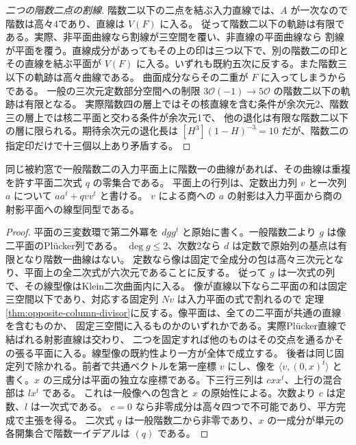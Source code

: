 \begin{proof}[二つの階数二点の割線]
階数二以下の二点を結ぶ入力直線では、$A$ が一次なので階数は高々4であり、直線は $V(F)$ に入る。
従って階数二以下の軌跡は有限である。実際、非平面曲線なら割線が三空間を覆い、非直線の平面曲線なら
割線が平面を覆う。直線成分があってもその上の印は三つ以下で、別の階数二の印とその直線を結ぶ平面が
$V(F)$ に入る。いずれも既約五次に反する。また階数三以下の軌跡は高々曲線である。
曲面成分ならその二重が $F$ に入ってしまうからである。
一般の三次元定数部分空間への制限 $3\mathcal O(-1)\to5\mathcal O$ の階数二以下の軌跡は有限となる。
実際階数四の層上ではその核直線を含む条件が余次元2、階数三の層上では核二平面と交わる条件が余次元1で、
他の退化は有限な階数二以下の層に限られる。期待余次元の退化長は
$[H^3](1-H)^{-3}=10$ だが、階数二の指定印だけで十三個以上あり矛盾する。
\end{proof}

\begin{proposition}\label{prop:rank-two-plane-conic-trace}
同じ被約窓で一般階数二の入力平面上に階数一の曲線があれば、その曲線は重複を許す平面二次式 $q$ の零集合である。
平面上の行列は、定数出力列 $v$ と一次列 $a$ について $aa^t+q vv^t$ と書ける。
$v$ による商への $a$ の射影は入力平面から商の射影平面への線型同型である。
\end{proposition}
\begin{proof}
平面の三変数環で第二外冪を $d gg^t$ と原始に書く。一般階数二より $g$ は像二平面のPlücker列である。
$\deg g\le2$、次数2なら $d$ は定数で原始列の基点は有限となり階数一曲線はない。
定数なら像は固定で全成分の包は高々三次元となり、平面上の全二次式が六次元であることに反する。
従って $g$ は一次式の列で、その線型像はKlein二次曲面内に入る。
像が直線以下なら二平面の和は固定三空間以下であり、対応する固定列 $Nv$ は入力平面の式で割れるので
定理\ref{thm:opposite-column-divisor}に反する。像平面は、全ての二平面が共通の直線を含むものか、
固定三空間に入るものかのいずれかである。実際Plücker直線で結ばれる射影直線は交わり、
二つを固定すれば他のものはその交点を通るかその張る平面に入る。線型像の既約性より一方が全体で成立する。
後者は同じ固定列で除かれる。前者で共通ベクトルを第一座標 $v$ にし、像を $\langle v,(0,x)^t\rangle$
と書く。$x$ の三成分は平面の独立な座標である。下三行三列は $cxx^t$、上行の混合部は $l x^t$ である。
これは一般像への包含と $x$ の原始性による。次数より $c$ は定数、$l$ は一次式である。
$c=0$ なら非零成分は高々四つで不可能であり、平方完成で主張を得る。
二次式 $q$ は一般階数二から非零であり、$x$ の一成分が単元の各開集合で階数一イデアルは $(q)$ である。
\end{proof}
